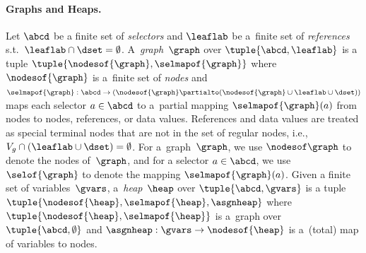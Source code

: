{%



\paragraph{Graphs and Heaps.}

Let $\abcd$ be a finite set of \emph{selectors} and $\leaflab$ be a~finite set
of \emph{references} s.t.~$\leaflab \cap \dset = \emptyset$.
A~\emph{graph}~$\graph$ over $\tuple{\abcd,\leaflab}$ is
a tuple $\tuple{\nodesof{\graph},\selmapof{\graph}}$ where
$\nodesof{\graph}$ is a~finite set  of \emph{nodes} and $\selmapof{\graph}: \abcd \to (\nodesof{\graph}
\partialto (\nodesof{\graph}\cup \leaflab \cup \dset))$ maps each selector $a \in \abcd$
to a~partial mapping $\selmapof{\graph}(a)$ from nodes to nodes, references, or
data values.
%
References and data values are treated as special terminal
nodes that are not in the set of regular nodes, i.e., $V_g \cap (\leaflab \cup
\dset) = \emptyset$.
%
For a~graph~$\graph$, we use $\nodesof \graph$ to denote the nodes of~$\graph$,
and for a selector $a \in \abcd$, we
use $\selof{\graph}$ to denote the mapping $\selmapof{\graph}(a)$.
Given a finite set of variables~$\gvars$,
a~\emph{heap}~$\heap$ over $\tuple{\abcd, \gvars}$ is
a tuple $\tuple{\nodesof{\heap},\selmapof{\heap}, \asgnheap}$ where
$\tuple{\nodesof{\heap}, \selmapof{\heap}}$ is a~graph over $\tuple{\abcd,
\emptyset}$ and $\asgnheap: \gvars \to \nodesof{\heap}$ is a~(total)
map of variables to nodes.

}

